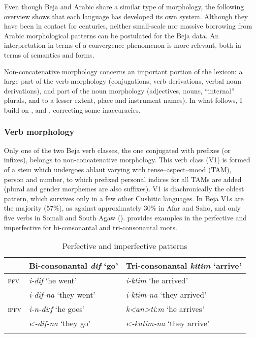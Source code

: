 \documentclass[output=paper]{langsci/langscibook}
\begin{document}
Even though Beja and Arabic share a similar type of morphology, the following overview shows that each language has developed its own system. Although they have been in contact for centuries, neither small-scale nor massive borrowing from Arabic morphological patterns can be postulated for the Beja data. An interpretation in terms of a convergence phenomenon is more relevant, both in terms of semantics and forms.

Non-concatenative morphology concerns an important portion of the lexicon: a large part of the verb morphology (conjugations, verb derivations, verbal noun derivations), and part of the noun morphology (adjectives, nouns, “internal” plurals, and to a lesser extent, place and instrument names). In what follows, I build on \citet{Vanhove2012}, and \citet{Vanhove2017}, correcting some inaccuracies.


 \subsubsection{Verb morphology}

Only one of the two Beja verb classes, the one conjugated with prefixes (or infixes), belongs to non-concatenative morphology. This verb class (V1) is formed of a stem which undergoes ablaut varying with tense--aspect--mood (TAM), person and number, to which prefixed personal indices for all TAMs are added (plural and gender morphemes are also suffixes). V1 is diachronically the oldest pattern, which survives only in a few other Cushitic languages. In Beja V1s are the majority (57\%), as against approximately 30\% in Afar and Saho, and only five verbs in Somali and South Agaw (\citealt[256]{Cohen1988}).  provides examples in the perfective and imperfective for bi-consonantal and tri-consonantal roots. 

\begin{table}
\begin{tabular}{lll}
\lsptoprule
& Bi-consonantal \textit{dif} ‘go’ & Tri-consonantal \textit{kitim} ‘arrive’\\\midrule
\textsc{pfv} & \textit{i-dif} ‘he went’  & \textit{i-ktim} ‘he arrived’\\
{} & \textit{i-dif-na} ‘they went’ & \textit{i-ktim-na} ‘they arrived’\\
\textsc{ipfv} & \textit{i-n-diːf} ‘he goes’ & \textit{k<an>tiːm} ‘he arrives’\\
{} &\textit{eː-dif-na} ‘they go’ & \textit{eː-katim-na} ‘they arrive’\\
\lspbottomrule
\end{tabular} 
\caption{Perfective and imperfective patterns}
\label{tab:vanhove:2}
\end{table}
\end{document}
